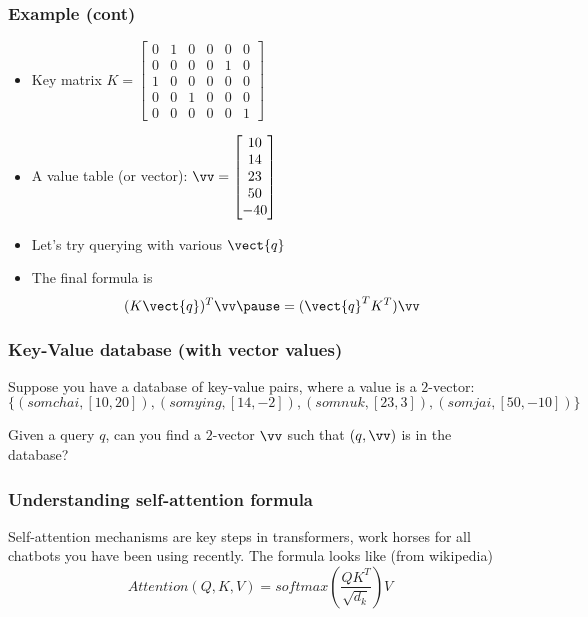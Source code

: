 \begin{frame}
  \frametitle{Example (cont)}
  \begin{itemize}
  \item Key matrix
    {\small
      $
      K=\begin{bmatrix}
      0 & 1 & 0 & 0 & 0 & 0\\
      0 & 0 & 0 & 0 & 1 & 0\\
      1 & 0 & 0 & 0 & 0 & 0\\
      0 & 0 & 1 & 0 & 0 & 0\\
      0 & 0 & 0 & 0 & 0 & 1
      \end{bmatrix}
      $
    }
  \item A value table (or vector):
    {\small
      $\vv = 
      \begin{bmatrix}
        10 \\ 14 \\ 23 \\ 50 \\ -40
      \end{bmatrix}
      $
    }
  \item Let's try querying with various $\vect{q}$
    \pause
    \pause
  \item The final formula is
    \[
    (K\vect{q})^T\vv \pause
    = (\vect{q}^T K^T)\vv
    \]
  \end{itemize}
\end{frame}

\begin{frame}
  \frametitle{Key-Value database (with vector values)}

  Suppose you have a database of key-value pairs, where a value is a $2$-vector:
  \[
  \{(somchai,[10,20]), (somying,[14,-2]), (somnuk,[23,3]), (somjai,[50,-10])\}
  \]
  
  Given a query $q$, can you find a $2$-vector $\vv$ such that $(q,\vv)$ is in the database?

  \vspace{2in}
  
\end{frame}

\begin{frame}
  \frametitle{Understanding self-attention formula}

  Self-attention mechanisms are key steps in transformers, work horses
  for all chatbots you have been using recently.  The formula looks
  like (from wikipedia)
  \[
  Attention(Q,K,V) = softmax\left(\frac{QK^T}{\sqrt{d_k}}\right)V
  \]
  \vspace{1.5in}
  
\end{frame}



